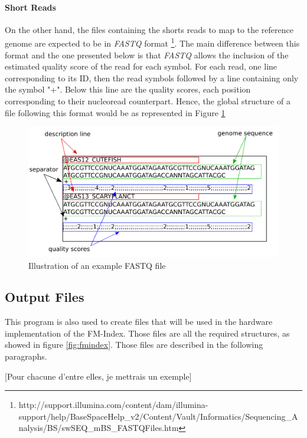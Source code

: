 \paragraph{Short Reads}
On the other hand, the files containing the shorts reads to map to the reference genome are expected to be in \textsl{FASTQ} format \footnote{http://support.illumina.com/content/dam/illumina-support/help/BaseSpaceHelp_v2/Content/Vault/Informatics/Sequencing_Analysis/BS/swSEQ_mBS_FASTQFiles.htm}. The main difference between this format and the one presented below is that \textsl{FASTQ} allows the inclusion of the estimated quality score of the read for each symbol. For each read, one line corresponding to its ID, then the read symbols followed by a line containing only the symbol "+". Below this line are the quality scores, each position corresponding to their nucleoread counterpart. Hence, the global structure of a file following this format would be as represented in Figure \ref{fig:fastq}


\begin{figure}[H]
    \centering
    \includegraphics[scale = 0.35]{Figures/fastqex.png}
    \caption{Illustration of an example FASTQ file }
    \label{fig:fastq}
\end{figure}

\subsection{Output Files}

This program is also used to create files that will be used in the hardware implementation of the FM-Index. Those files are all the required structures, as showed in figure \ref{fig:fmindex}. Those files are described in the following paragraphs. 

[Pour chacune d'entre elles, je mettrais un exemple]

